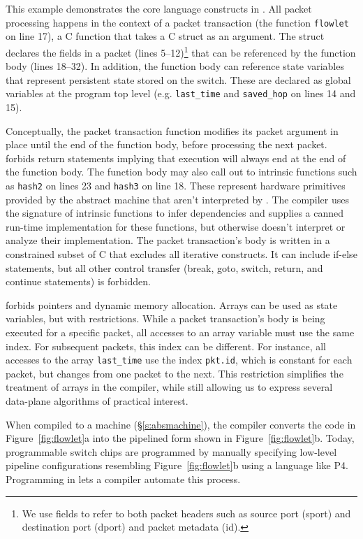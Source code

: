 This example demonstrates the core language constructs in \pktlanguage. All
packet processing happens in the context of a packet transaction (the function
\texttt{flowlet} on line 17), a C function that takes a C struct as an
argument. The struct declares the fields in a packet (lines 5--12)\footnote{We
  use fields to refer to both packet headers such as source port (sport) and
destination port (dport) and packet metadata (id).} that can be referenced by the
function body (lines 18--32).  In addition, the function body can reference
state variables that represent persistent state stored on the switch. These are
declared as global variables at the program top level (e.g. \texttt{last\_time}
and \texttt{saved\_hop} on lines 14 and 15).

Conceptually, the packet transaction function modifies its packet argument in
place until the end of the function body, before processing the next packet.
\pktlanguage forbids return statements implying that execution will always end at the
end of the function body. The function body may also call out to intrinsic
functions such as \texttt{hash2} on lines 23 and \texttt{hash3} on line 18.
These represent hardware primitives provided by the abstract machine that
aren't interpreted by \pktlanguage. The \pktlanguage compiler uses the
signature of intrinsic functions to infer dependencies and supplies a canned
run-time implementation for these functions, but otherwise doesn't interpret or
analyze their implementation. The packet
transaction's body is written in a constrained subset of C that excludes all
iterative constructs. It can include if-else statements,
but all other control transfer (break, goto, switch, return, and continue
statements) is forbidden.

\pktlanguage forbids pointers and dynamic memory allocation. Arrays can be used
as state variables, but with restrictions. While a packet transaction's body is
being executed for a specific packet, all accesses to an array variable must use the
same index. For subsequent packets, this index can be different. For instance,
all accesses to the array \texttt{last\_time} use the
index \texttt{pkt.id}, which is constant for each packet, but changes from one
packet to the next. This restriction simplifies the treatment of arrays in the
compiler, while still allowing us to express several data-plane algorithms of
practical interest.
%
%

When compiled to a \absmachine machine (\S\ref{s:absmachine}), the \pktlanguage
compiler converts the code in Figure~\ref{fig:flowlet}a into the pipelined form
shown in Figure~\ref{fig:flowlet}b. Today, programmable switch chips are
programmed by manually specifying low-level pipeline configurations resembling
Figure~\ref{fig:flowlet}b using a language like P4. Programming in \pktlanguage
lets a compiler automate this process.
